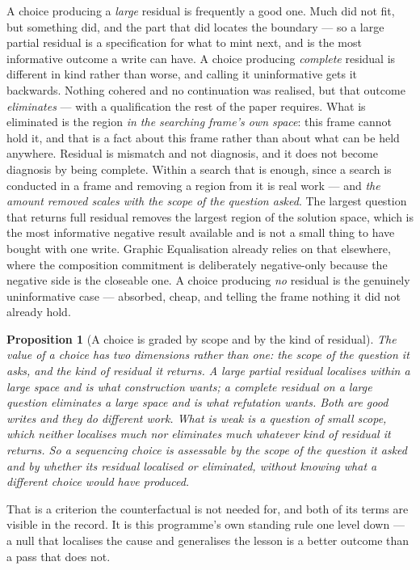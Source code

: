 \documentclass[11pt,a4paper]{article}
\newtheorem{proposition}{Proposition}[section]
\begin{document}
A choice producing a \emph{large} residual is frequently a good one. Much did not fit, but something
did, and the part that did locates the boundary --- so a large partial residual is a specification for
what to mint next, and is the most informative outcome a write can have. A choice producing \emph{complete} residual
is different in kind rather than worse, and calling it uninformative gets it backwards. Nothing cohered and no continuation was realised, but that outcome
\emph{eliminates} --- with a qualification the rest of the paper requires. What is eliminated is the region \emph{in the searching frame's own space}:
this frame cannot hold it, and that is a fact about this frame rather than about what can be held
anywhere. Residual is mismatch and not diagnosis, and it does not become diagnosis by being complete.
Within a search that is enough, since a search is conducted in a frame and removing a region from it is
real work --- and \emph{the amount removed scales with the scope of the question asked}. The largest question that returns full residual
removes the largest region of the solution space, which is the most informative negative result
available and is not a small thing to have bought with one write. Graphic Equalisation already relies on that
elsewhere, where the composition commitment is deliberately negative-only because the negative side is
the closeable one. A choice producing \emph{no} residual is the genuinely uninformative case --- absorbed,
cheap, and telling the frame nothing it did not already hold.

\begin{proposition}[A choice is graded by scope and by the kind of residual]\label{prop:scope-residual}
The value of a choice has two dimensions rather than one: the \emph{scope} of the question it asks,
and the \emph{kind} of residual it returns. A large partial residual localises within a large space
and is what construction wants; a complete residual on a large question eliminates a large space and
is what refutation wants. Both are good writes and they do different work. What is weak is a question
of small scope, which neither localises much nor eliminates much whatever kind of residual it
returns. So a sequencing choice is assessable by the scope of the question it asked and by whether
its residual localised or eliminated, without knowing what a different choice would have produced.
\end{proposition}

\noindent That is a criterion the counterfactual is not needed for, and both of its terms are visible
in the record. It is this programme's own standing rule one level down --- a null
that localises the cause and generalises the lesson is a better outcome than a pass that does not.
\end{document}
